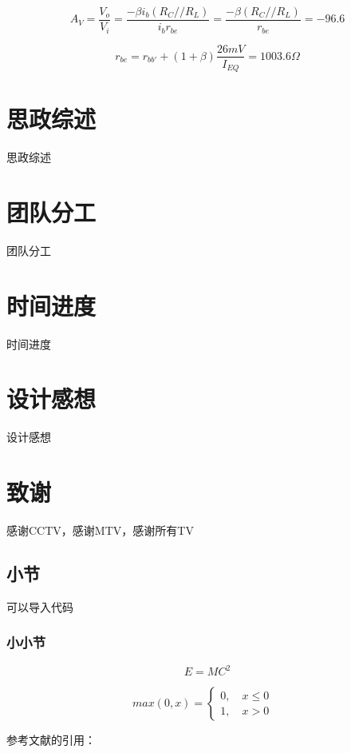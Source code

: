 \documentclass[10pt, conference, compsocconf]{IEEEtran}
\begin{document}
\begin{equation}
  A_V=\frac{V_o}{V_i}=\frac{-\beta i_b(R_C//R_L)}{i_br_{be}}=\frac{-\beta(R_C//R_L)}{r_{be}}=-96.6
\end{equation}

\begin{equation}
  r_{be}=r_{bb'}+(1+\beta)\frac{26mV}{I_{EQ}}=1003.6\Omega
\end{equation}

\section{思政综述}
思政综述

\section{团队分工}
团队分工
\section{时间进度}
时间进度
\section{设计感想}
设计感想
\section{致谢}
感谢CCTV，感谢MTV，感谢所有TV





\subsection{小节}
可以导入代码



\subsubsection{小小节}

\begin{equation}
  E= MC^2
\end{equation}


\begin{equation}
max(0,x)=\left\{
\begin{aligned}
0, \quad x \leq 0 & \\
1, \quad x > 0  &
\end{aligned}
\right.
\end{equation}

参考文献的引用：
\cite{yearbook2005china}

 
   



\end{document}
